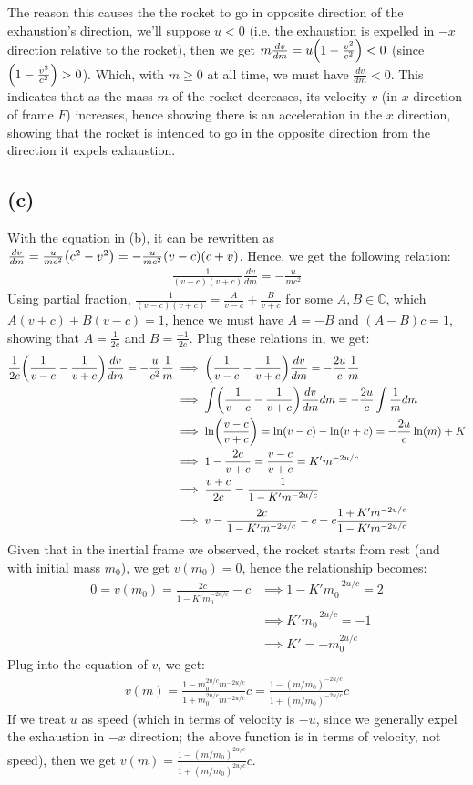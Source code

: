 \documentclass{article}
\newcommand{\CC}{\mathbb{C}}
\DeclarePairedDelimiter{\paran}{(}{)}%
\begin{document}
The reason this causes the the rocket to go in opposite direction of the exhaustion's direction, we'll suppose $u<0$ (i.e. the exhaustion is expelled in $-x$ direction relative to the rocket), then we get $m\frac{dv}{dm} = u\paran*{1-\frac{v^2}{c^2}}<0$ (since $\paran*{1-\frac{v^2}{c^2}}>0$). Which, with $m\geq 0$ at all time, we must have $\frac{dv}{dm}<0$. This indicates that as the mass $m$ of the rocket decreases, its velocity $v$ (in $x$ direction of frame $F$) increases, hence showing there is an acceleration in the $x$ direction, showing that the rocket is intended to go in the opposite direction from the direction it expels exhaustion.

\subsection*{(c)}
With the equation in (b), it can be rewritten as $\frac{dv}{dm} = \frac{u}{mc^2}\paran*{c^2-v^2} = -\frac{u}{mc^2}(v-c)(c+v)$. Hence, we get the following relation:
\begin{align}
    \frac{1}{(v-c)(v+c)}\frac{dv}{dm} = -\frac{u}{mc^2}
\end{align}
Using partial fraction, $\frac{1}{(v-c)(v+c)} = \frac{A}{v-c}+\frac{B}{v+c}$ for some $A,B \in \CC$, which $A(v+c) + B(v-c) = 1$, hence we must have $A=-B$ and $(A-B)c = 1$, showing that $A=\frac{1}{2c}$ and $B=\frac{-1}{2c}$. Plug these relations in, we get:
\begin{align}
    \frac{1}{2c}\paran*{\frac{1}{v-c}-\frac{1}{v+c}}\frac{dv}{dm} = -\frac{u}{c^2}\frac{1}{m}&\implies \paran*{\frac{1}{v-c}-\frac{1}{v+c}}\frac{dv}{dm} = -\frac{2u}{c}\frac{1}{m}\\
    &\implies \int \paran*{\frac{1}{v-c}-\frac{1}{v+c}}\frac{dv}{dm}dm = -\frac{2u}{c}\int \frac{1}{m}dm \\
    &\implies \ln\paran*{\frac{v-c}{v+c}}=\ln(v-c) - \ln(v+c) = -\frac{2u}{c}\ln(m)+K\\
    &\implies 1-\frac{2c}{v+c} = \frac{v-c}{v+c} = K'm^{-2u/c}\\
    &\implies \frac{v+c}{2c} = \frac{1}{1-K'm^{-2u/c}}\\ 
    &\implies v = \frac{2c}{1-K'm^{-2u/c}}-c = c\frac{1+K'm^{-2u/c}}{1-K'm^{-2u/c}}
\end{align}
Given that in the inertial frame we observed, the rocket starts from rest (and with initial mass $m_0$), we get $v(m_0) = 0$, hence the relationship becomes:
\begin{align}
    0=v(m_0)=\frac{2c}{1-K'm_0^{-2u/c}}-c&\implies 1-K'm_0^{-2u/c} = 2\\
    &\implies K'm_0^{-2u/c} = -1\\
    &\implies K' = -m_0^{2u/c}
\end{align}
Plug into the equation of $v$, we get:
\begin{align}
    v(m) = \frac{1-m_0^{2u/c}m^{-2u/c}}{1+m_0^{2u/c}m^{-2u/c}}c = \frac{1-(m/m_0)^{-2u/c}}{1+(m/m_0)^{-2u/c}}c
\end{align}
If we treat $u$ as speed (which in terms of velocity is $-u$, since we generally expel the exhaustion in $-x$ direction; the above function is in terms of velocity, not speed), then we get $v(m) = \frac{1-(m/m_0)^{2u/c}}{1+(m/m_0)^{2u/c}}c$. 
\end{document}
